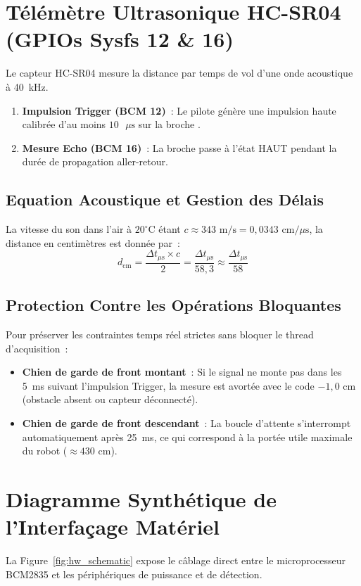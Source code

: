 \section{Télémètre Ultrasonique HC-SR04 (GPIOs Sysfs 12 \& 16)}
Le capteur HC-SR04 mesure la distance par temps de vol d'une onde acoustique à 40~kHz.
\begin{enumerate}
    \item \textbf{Impulsion Trigger (BCM 12)}~: Le pilote génère une impulsion haute calibrée d'au moins $10\text{ }\mu\text{s}$ sur la broche .
    \item \textbf{Mesure Echo (BCM 16)}~: La broche  passe à l'état HAUT pendant la durée de propagation aller-retour.
\end{enumerate}

\subsection{Equation Acoustique et Gestion des Délais}
La vitesse du son dans l'air à $20^\circ\text{C}$ étant $c \approx 343\text{ m/s} = 0{,}0343\text{ cm/}\mu\text{s}$, la distance en centimètres est donnée par~:
\begin{equation}
    d_{\text{cm}} = \frac{\Delta t_{\mu\text{s}} \times c}{2} = \frac{\Delta t_{\mu\text{s}}}{58{,}3} \approx \frac{\Delta t_{\mu\text{s}}}{58}
\end{equation}

\subsection{Protection Contre les Opérations Bloquantes}
Pour préserver les contraintes temps réel strictes sans bloquer le thread d'acquisition~:
\begin{itemize}
    \item \textbf{Chien de garde de front montant}~: Si le signal  ne monte pas dans les 5~ms suivant l'impulsion Trigger, la mesure est avortée avec le code $-1{,}0\text{ cm}$ (obstacle absent ou capteur déconnecté).
    \item \textbf{Chien de garde de front descendant}~: La boucle d'attente s'interrompt automatiquement après 25~ms, ce qui correspond à la portée utile maximale du robot ($\approx 430\text{ cm}$).
\end{itemize}

\section{Diagramme Synthétique de l'Interfaçage Matériel}
La Figure~\ref{fig:hw_schematic} expose le câblage direct entre le microprocesseur BCM2835 et les périphériques de puissance et de détection.

